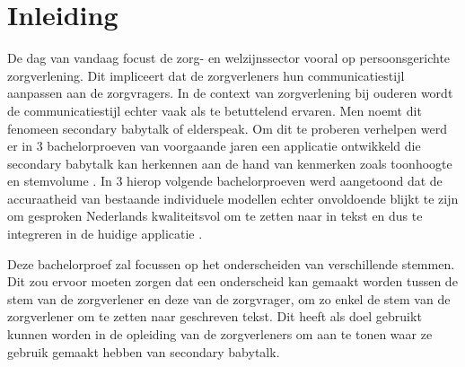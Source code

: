 


% 

\section{Inleiding}%
\label{sec:inleiding}

De dag van vandaag focust de zorg- en welzijnssector vooral op persoonsgerichte zorgverlening. Dit impliceert dat de zorgverleners hun communicatiestijl aanpassen aan de zorgvragers. In de context van zorgverlening bij ouderen wordt de communicatiestijl echter vaak als te betuttelend ervaren. Men noemt dit fenomeen secondary babytalk of elderspeak. Om dit te proberen verhelpen werd er in 3 bachelorproeven van voorgaande jaren een applicatie ontwikkeld die secondary babytalk kan herkennen aan de hand van kenmerken zoals toonhoogte en stemvolume \autocite{Govaerts2022,Gussem2022,Daems2023}. In 3 hierop volgende bachelorproeven werd aangetoond dat de accuraatheid van bestaande individuele modellen echter onvoldoende blijkt te zijn om gesproken Nederlands kwaliteitsvol om te zetten naar in tekst en dus te integreren in de huidige applicatie \autocite{Branden2024,Coetsiers2024,Schryver2024}.

Deze bachelorproef zal focussen op het onderscheiden van verschillende stemmen. Dit zou ervoor moeten zorgen dat een onderscheid kan gemaakt worden tussen de stem van de zorgverlener en deze van de zorgvrager, om zo enkel de stem van de zorgverlener om te zetten naar geschreven tekst. Dit heeft als doel gebruikt kunnen worden in de opleiding van de zorgverleners om aan te tonen waar ze gebruik gemaakt hebben van secondary babytalk.


